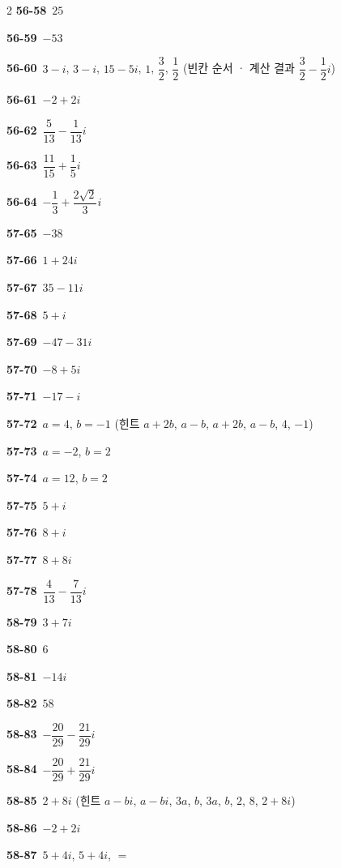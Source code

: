 \documentclass[10pt,a4paper]{article}
\begin{document}
\begin{multicols}{2}
\noindent\textbf{56-58}\ $25$\par
\noindent\textbf{56-59}\ $-53$\par
\noindent\textbf{56-60}\ $3-i$, $3-i$, $15-5i$, $1$, $\dfrac{3}{2}$, $\dfrac{1}{2}$ (빈칸 순서 · 계산 결과 $\dfrac{3}{2}-\dfrac{1}{2}i$)\par
\noindent\textbf{56-61}\ $-2+2i$\par
\noindent\textbf{56-62}\ $\dfrac{5}{13}-\dfrac{1}{13}i$\par
\noindent\textbf{56-63}\ $\dfrac{11}{15}+\dfrac{1}{5}i$\par
\noindent\textbf{56-64}\ $-\dfrac{1}{3}+\dfrac{2\sqrt{2}}{3}i$\par
\noindent\textbf{57-65}\ $-38$\par
\noindent\textbf{57-66}\ $1+24i$\par
\noindent\textbf{57-67}\ $35-11i$\par
\noindent\textbf{57-68}\ $5+i$\par
\noindent\textbf{57-69}\ $-47-31i$\par
\noindent\textbf{57-70}\ $-8+5i$\par
\noindent\textbf{57-71}\ $-17-i$\par
\noindent\textbf{57-72}\ $a=4$, $b=-1$ (힌트 $a+2b$, $a-b$, $a+2b$, $a-b$, $4$, $-1$)\par
\noindent\textbf{57-73}\ $a=-2$, $b=2$\par
\noindent\textbf{57-74}\ $a=12$, $b=2$\par
\noindent\textbf{57-75}\ $5+i$\par
\noindent\textbf{57-76}\ $8+i$\par
\noindent\textbf{57-77}\ $8+8i$\par
\noindent\textbf{57-78}\ $\dfrac{4}{13}-\dfrac{7}{13}i$\par
\noindent\textbf{58-79}\ $3+7i$\par
\noindent\textbf{58-80}\ $6$\par
\noindent\textbf{58-81}\ $-14i$\par
\noindent\textbf{58-82}\ $58$\par
\noindent\textbf{58-83}\ $-\dfrac{20}{29}-\dfrac{21}{29}i$\par
\noindent\textbf{58-84}\ $-\dfrac{20}{29}+\dfrac{21}{29}i$\par
\noindent\textbf{58-85}\ $2+8i$ (힌트 $a-bi$, $a-bi$, $3a$, $b$, $3a$, $b$, $2$, $8$, $2+8i$)\par
\noindent\textbf{58-86}\ $-2+2i$\par
\noindent\textbf{58-87}\ $5+4i$, $5+4i$, $=$\par

\end{multicols}
\end{document}
